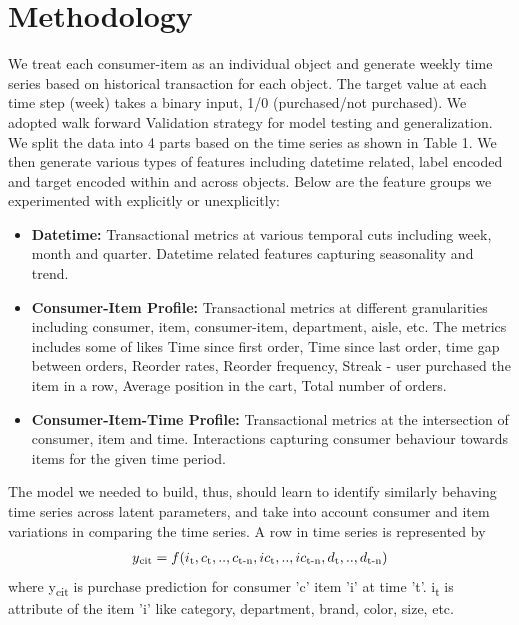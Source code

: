 \section{Methodology}
We treat each consumer-item as an individual object and generate weekly time series based on historical transaction for 
each object. The target value at each time step (week) takes a binary input, 1/0 (purchased/not purchased).
We adopted walk forward Validation strategy for model testing and generalization. We split the data into 4 parts
based on the time series as shown in Table 1.
We then generate various types of features including datetime related, label encoded and target encoded 
within and across objects. Below are the feature groups we experimented with explicitly or unexplicitly:
\begin{itemize}
\item {\bf Datetime:} Transactional metrics at various temporal cuts including week, month and quarter. 
Datetime related features capturing seasonality and trend.
\item {\bf Consumer-Item Profile:} Transactional metrics at different granularities including consumer, item,
consumer-item, department, aisle, etc. The metrics includes some of likes Time since first order, 
Time since last order, time gap between orders, Reorder rates, Reorder frequency, 
Streak - user purchased the item in a row, Average position in the cart, Total number of orders.
\item {\bf Consumer-Item-Time Profile:} Transactional metrics at the intersection of consumer, item and time.
Interactions capturing consumer behaviour towards items for the given time period.
\end{itemize}
The model we needed to build, thus, should learn to identify similarly behaving time series across latent
parameters, and take into account consumer and item variations in comparing the time series. A row in time series 
is represented by
  \begin{equation}
    \begin{array}{l}
      y\textsubscript{cit}  = f(i\textsubscript{t}, c\textsubscript{t},..,c\textsubscript{t-n}, ic\textsubscript{t}
      ,..,ic\textsubscript{t-n}, d\textsubscript{t},..,d\textsubscript{t-n})
    \end{array}
    \label{eqn:fx}
  \end{equation}
where y\textsubscript{cit} is purchase prediction for consumer 'c' item ’i’ at time ’t’. 
i\textsubscript{t} is attribute of the item ’i’ like category, department, brand, color, size, etc. 
